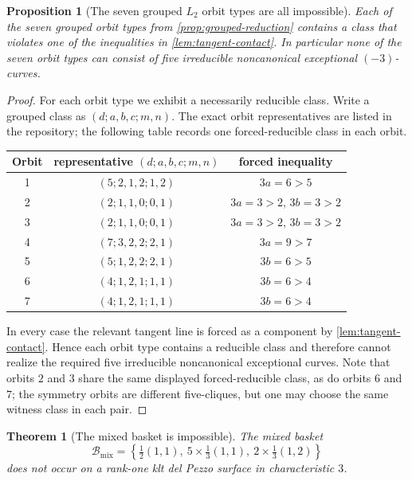 \documentclass[11pt]{article}
\newtheorem{theorem}{Theorem}[section]
\newtheorem{proposition}[proposition]{Proposition}
\theoremstyle{definition}
\begin{document}
\begin{proposition}[The seven grouped $L_2$ orbit types are all impossible]\label{prop:seven-orbits}
Each of the seven grouped orbit types from \cref{prop:grouped-reduction} contains a class that violates one of the inequalities in \cref{lem:tangent-contact}. In particular none of the seven orbit types can consist of five irreducible noncanonical exceptional $(-3)$-curves.
\end{proposition}

\begin{proof}
For each orbit type we exhibit a necessarily reducible class. Write a grouped class as $(d;a,b,c;m,n)$. The exact orbit representatives are listed in the repository; the following table records one forced-reducible class in each orbit.

\begin{center}
\begin{tabular}{c|c|c}
\toprule
Orbit & representative $(d;a,b,c;m,n)$ & forced inequality \\
\midrule
1 & $(5;2,1,2;1,2)$ & $3a=6>5$ \\
2 & $(2;1,1,0;0,1)$ & $3a=3>2$, $3b=3>2$ \\
3 & $(2;1,1,0;0,1)$ & $3a=3>2$, $3b=3>2$ \\
4 & $(7;3,2,2;2,1)$ & $3a=9>7$ \\
5 & $(5;1,2,2;2,1)$ & $3b=6>5$ \\
6 & $(4;1,2,1;1,1)$ & $3b=6>4$ \\
7 & $(4;1,2,1;1,1)$ & $3b=6>4$ \\
\bottomrule
\end{tabular}
\end{center}

In every case the relevant tangent line is forced as a component by \cref{lem:tangent-contact}. Hence each orbit type contains a reducible class and therefore cannot realize the required five irreducible noncanonical exceptional curves. Note that orbits $2$ and $3$ share the same displayed forced-reducible class, as do orbits $6$ and $7$; the symmetry orbits are different five-cliques, but one may choose the same witness class in each pair.
\end{proof}

\begin{theorem}[The mixed basket is impossible]\label{thm:mixed-impossible}
The mixed basket
\[
\mathcal B_{\mathrm{mix}}=\left\{\tfrac12(1,1),\ 5\times\tfrac13(1,1),\ 2\times\tfrac13(1,2)\right\}
\]
does not occur on a rank-one klt del Pezzo surface in characteristic $3$.
\end{theorem}
\end{document}
